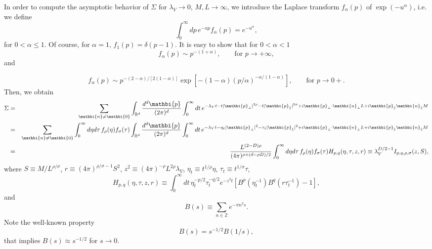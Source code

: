 \documentclass[a4paper,12pt]{article}
\newcommand{\pos}[1]{\mathbi{#1}}
\begin{document}
In order to compute the asymptotic behavior of $\Sigma$ for
$\lambda_V\to 0$, $M,L\to \infty$, we introduce the Laplace
transform $f_\alpha(p)$ of $\exp(-u^\alpha)$, i.e. we define
\begin{equation}
\int^\infty_0 dp\, e^{-u p} f_\alpha(p) = e^{-u^\alpha},
\end{equation}
for $0<\alpha\le 1$. Of course, for $\alpha = 1$, $f_1(p) = \delta(p-1)$.
It is easy to show that for $0<\alpha<1$ 
\begin{equation}
f_\alpha(p) \sim p^{-(1+\alpha)}, \qquad \text{for $p \to +\infty$},
\end{equation}
and {
\begin{equation}
f_\alpha(p) \sim p^{-(2-\alpha)/[2(1-\alpha)]}
   \exp\left[-(1-\alpha) (p/\alpha)^{-\alpha/(1-\alpha)}\right],
    \qquad \text{for $p \to 0+$}.
\end{equation}
Then, we obtain
\begin{eqnarray}
\Sigma & = & \sum_{\pos{n} \neq \pos{0}}\int_{\mathbb{R}^d}
\frac{d^d\pos{p}}{(2\pi)^d} \int_0^\infty dt\,
e^{-\lambda_V t -t |\pos{p}_\bot|^{2\rho} -t |\pos{p}_\||^{2\sigma} +i 
\pos{p}_\bot \cdot \pos{n}_\bot L + i \pos{p}_\| \pos{n}_\| M}
\nonumber \\
& = & \sum_{\pos{n} \neq \pos{0}}
     \int_0^\infty d\eta d\tau\, f_\rho(\eta)f_\sigma(\tau)
     \int_{\mathbb{R}^d} \frac{d^d\pos{p}}{(2\pi)^d}
      \int_0^\infty dt\,
e^{-\lambda_V t -\eta_t |\pos{p}_\bot|^{2} -\tau_t |\pos{p}_\||^{2} +
      i \pos{p}_\bot \cdot \pos{n}_\bot L + i \pos{p}_\| \pos{n}_\| M}
\nonumber \\
& = & \frac{L^{(2-D)\rho}}{(4 \pi)^{\rho+(d-\rho D)/2}}
    \int_0^\infty d\eta d\tau\, f_\rho(\eta)f_\sigma(\tau) H_{p,q}(\eta,\tau,z,r)
   \equiv \lambda_V^{D/2-1} I_{p,q,\rho,\sigma}(z,S),
\label{sigma-as}
\end{eqnarray}
where $S \equiv M/L^{\rho/\sigma}$, $r \equiv (4\pi)^{\rho/\sigma-1} S^2$, 
$z^2 \equiv (4\pi)^{-\rho} L^{2 \rho} \lambda_V$, 
$\eta_t \equiv t^{1/\rho}\eta$, $\tau_t \equiv t^{1/\sigma}\tau$,
\begin{equation}
H_{p,q}(\eta,\tau,z,r) \equiv
\int_0^\infty dt\, \eta_t^{-p/2} \tau_t^{-q/2}  e^{-z^2 t }
\left[ B^{p}\left(\eta_t^{-1}\right) B^q\left(r\tau_t^{-1}\right) 
-1\right],
\label{def-H}
\end{equation}
and
\begin{equation}
B(s) \equiv \sum_{n \in \mathbb{Z}} e^{-\pi n^2 s}.
\end{equation}
Note the well-known property
\begin{equation}
B(s) = s^{-1/2} B(1/s),
\label{B-duality}
\end{equation}
that implies $B(s)\approx s^{-1/2}$ for $s\to 0$.

}
\end{document}
